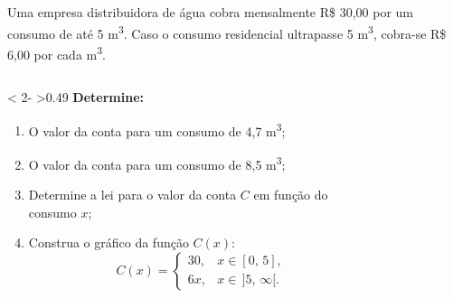 \begin{frame}
  \begin{example}
    Uma empresa distribuidora de água cobra mensalmente R\$ 30,00 por um consumo de até 5 m\textsuperscript{3}. Caso o consumo residencial
    ultrapasse 5 m\textsuperscript{3}, cobra-se R\$ 6,00 por cada m\textsuperscript{3}.
  \end{example}
  \begin{columns}[onlytextwidth]
    \begin{column}< 2- >{0.49\textwidth}
      \textbf{Determine:}
      \begin{enumerate}
        \item< 2- > O valor da conta para um consumo de 4,7 m\textsuperscript{3};
        \item< 3- > O valor da conta para um consumo de 8,5 m\textsuperscript{3};
        \item< 4- > Determine a lei para o valor da conta $C$ em função do consumo $x$;
        \item< 5- > Construa o gráfico da função $C(x)$:
        \begin{equation*}
          C(x) = \begin{cases}
            30, &x\in [0,\,5],\\
            6x, &x\in\, ]5,\,\infty[.
          \end{cases}
        \end{equation*}
      \end{enumerate}
    \end{column}
    \begin{column}{0.49\textwidth}
      \begin{figure}
        \vspace{-0.5cm}
      \end{figure}
    \end{column}
  \end{columns}
\end{frame}

